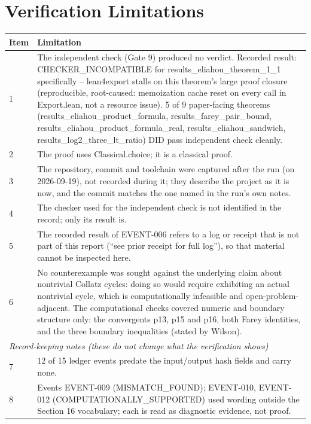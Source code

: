 \documentclass[11pt]{article}
\begin{document}
\section{Verification Limitations}
\begin{longtable}{p{}p{}}
\toprule Item & Limitation \\ \midrule \endhead
1 & The independent check (Gate 9) produced no verdict. Recorded result: CHECKER\_INCOMPATIBLE for results\_eliahou\_theorem\_1\_1 specifically -- lean4export stalls on this theorem's large proof closure (reproducible, root-caused: memoization cache reset on every call in Export.lean, not a resource issue). 5 of 9 paper-facing theorems (results\_eliahou\_product\_formula, results\_farey\_pair\_bound, results\_eliahou\_product\_formula\_real, results\_eliahou\_sandwich, results\_log2\_three\_lt\_ratio) DID pass independent check cleanly. \\
2 & The proof uses Classical.choice; it is a classical proof. \\
3 & The repository, commit and toolchain were captured after the run (on 2026-09-19), not recorded during it; they describe the project as it is now, and the commit matches the one named in the run's own notes. \\
4 & The checker used for the independent check is not identified in the record; only its result is. \\
5 & The recorded result of EVENT-006 refers to a log or receipt that is not part of this report (``see prior receipt for full log''), so that material cannot be inspected here. \\
6 & No counterexample was sought against the underlying claim about nontrivial Collatz cycles: doing so would require exhibiting an actual nontrivial cycle, which is computationally infeasible and open-problem-adjacent. The computational checks covered numeric and boundary structure only: the convergents p13, p15 and p16, both Farey identities, and the three boundary inequalities (stated by Wilson). \\
\midrule \multicolumn{2}{l}{\textit{Record-keeping notes (these do not change what the verification shows)}} \\ \midrule
7 & 12 of 15 ledger events predate the input/output hash fields and carry none. \\
8 & Events EVENT-009 (MISMATCH\_FOUND); EVENT-010, EVENT-012 (COMPUTATIONALLY\_SUPPORTED) used wording outside the Section 16 vocabulary; each is read as diagnostic evidence, not proof. \\
\bottomrule
\end{longtable}
\end{document}
